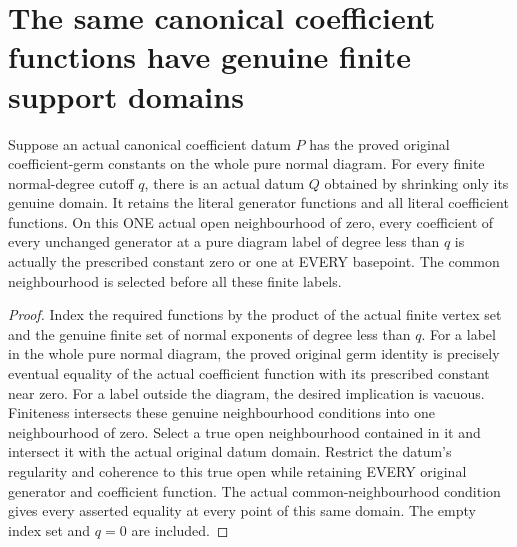 \section{The same canonical coefficient functions have genuine finite support domains}

\begin{theorem}
\label{hir:actual-canonical-finite-diagram-support-domain}
\leanok
Suppose an actual canonical coefficient datum $P$ has the proved original
coefficient-germ constants on the whole pure normal diagram. For every finite
normal-degree cutoff $q$, there is an actual datum $Q$ obtained by shrinking
only its genuine domain. It retains the literal generator functions and all
literal coefficient functions. On this ONE actual open neighbourhood of zero,
every coefficient of every unchanged generator at a pure diagram label of
degree less than $q$ is actually the prescribed constant zero or one at EVERY
basepoint. The common neighbourhood is selected before all these finite labels.
\end{theorem}
\begin{proof}
Index the required functions by the product of the actual finite vertex set
and the genuine finite set of normal exponents of degree less than $q$.
For a label in the whole pure normal diagram, the proved original germ
identity is precisely eventual equality of the actual coefficient function
with its prescribed constant near zero. For a label outside the diagram,
the desired implication is vacuous. Finiteness intersects these genuine
neighbourhood conditions into one neighbourhood of zero. Select a true open
neighbourhood contained in it and intersect it with the actual original
datum domain. Restrict the datum's regularity and coherence to this true
open while retaining EVERY original generator and coefficient function.
The actual common-neighbourhood condition gives every asserted equality at
every point of this same domain. The empty index set and $q=0$ are included.
\end{proof}

